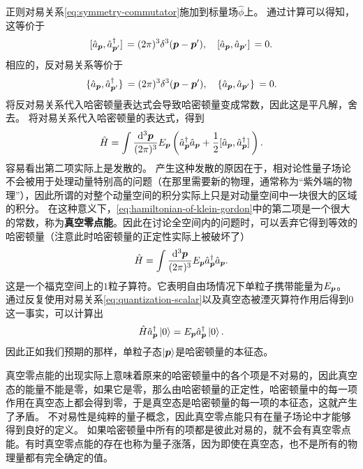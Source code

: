 \documentclass[hyperref, UTF8, a4paper]{ctexart}
\begin{document}
正则对易关系\eqref{eq:symmetry-commutator}施加到标量场$\hat{\phi}$上。
通过计算可以得知，这等价于
\begin{equation}
    \comm*{\hat{a}_{\vb*{p}}}{\hat{a}^\dagger_{\vb*{p}'}} = (2\pi)^3 \delta^3 (\vb*{p} - \vb*{p}'), \quad \comm*{\hat{a}_{\vb*{p}}}{\hat{a}_{\vb*{p}'}} = 0.
    \label{eq:quantization-scalar}
\end{equation}
相应的，反对易关系等价于
\[
    \acomm*{\hat{a}_{\vb*{p}}}{\hat{a}^\dagger_{\vb*{p}'}} = (2\pi)^3 \delta^3 (\vb*{p} - \vb*{p}'), \quad \acomm*{\hat{a}_{\vb*{p}}}{\hat{a}_{\vb*{p}'}} = 0.
\]
将反对易关系代入哈密顿量表达式会导致哈密顿量变成常数，因此这是平凡解，舍去。
将对易关系代入哈密顿量的表达式，得到
\begin{equation}
    \hat{H} = \int \frac{\dd[3]{\vb*{p}}}{(2\pi)^3} E_{\vb*{p}} \left(\hat{a}_{\vb*{p}}^\dagger \hat{a}_{\vb*{p}}  + \frac{1}{2} \comm*{\hat{a}_{\vb*{p}}}{\hat{a}^\dagger_{\vb*{p}}} \right).
    \label{eq:hamiltonian-of-klein-gordon}
\end{equation}
容易看出第二项实际上是发散的。
产生这种发散的原因在于，相对论性量子场论不会被用于处理动量特别高的问题（在那里需要新的物理，通常称为“紫外端的物理”），因此所谓的对整个动量空间的积分实际上只是对动量空间中一块很大的区域的积分。
在这种意义下，\eqref{eq:hamiltonian-of-klein-gordon}中的第二项是一个很大的常数，称为\textbf{真空零点能}。因此在讨论全空间内的问题时，可以丢弃它得到等效的哈密顿量（注意此时哈密顿量的正定性实际上被破坏了）%
\begin{equation}
    \hat{H} = \int \frac{\dd[3]{\vb*{p}}}{(2\pi)^3} E_{\vb*{p}} \hat{a}_{\vb*{p}}^\dagger \hat{a}_{\vb*{p}}.
\end{equation}
这是一个福克空间上的$1$粒子算符。它表明自由场情况下单粒子携带能量为$E_{\vb*{p}}$。
通过反复使用对易关系\eqref{eq:quantization-scalar}以及真空态被湮灭算符作用后得到$0$这一事实，可以计算出
\begin{equation}
    \hat{H} \hat{a}_{\vb*{p}}^\dagger \ket{0} = E_{\vb*{p}} \hat{a}_{\vb*{p}}^\dagger \ket{0}.
\end{equation}
因此正如我们预期的那样，单粒子态$\ket{\vb*{p}}$是哈密顿量的本征态。

真空零点能的出现实际上意味着原来的哈密顿量中的各个项是不对易的，因此真空态的能量不能是零，如果它是零，那么由哈密顿量的正定性，哈密顿量中的每一项作用在真空态上都会得到零，于是真空态是哈密顿量的每一项的本征态，这就产生了矛盾。
不对易性是纯粹的量子概念，因此真空零点能只有在量子场论中才能够得到良好的定义。
如果哈密顿量中所有的项都是彼此对易的，就不会有真空零点能。有时真空零点能的存在也称为量子涨落，因为即使在真空态，也不是所有的物理量都有完全确定的值。
\end{document}
